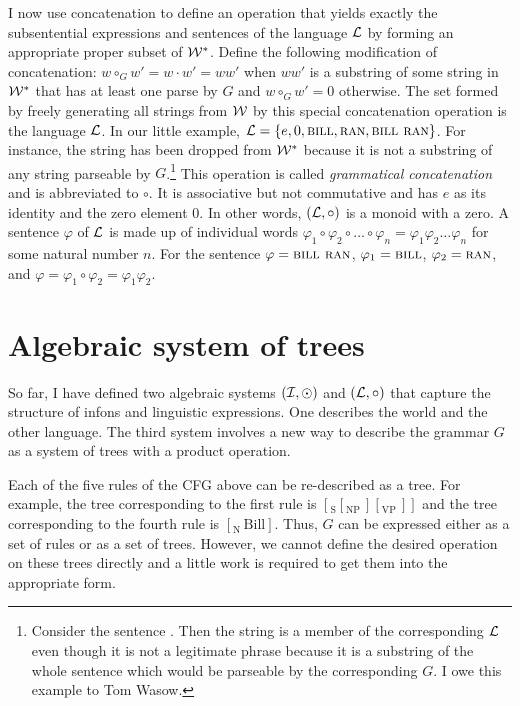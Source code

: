 I now use concatenation to define an operation that yields exactly the subsentential expressions and sentences of the language 
$\cal L$ by forming an appropriate proper subset of ${\cal W}^{\ast}$. Define the following modification of concatenation: $w \circ_G w' = w \cdot w' = ww'$ when $ww'$ is a substring of some string in ${\cal W}^{\ast}$ that has at least one parse by $G$ and $w \circ_G w' = 0$ otherwise. The set formed by freely generating all strings from ${\cal W}$ by this special concatenation operation is the language $\cal L$. In our little example, ${\cal L} = \{e, 0, \Expression{Bill}, \Expression{ran}, \Expression{Bill ran}\}$. For instance, the string  has been dropped from ${\cal W}^{\ast}$ because it is not a substring of any string parseable by $G$.\footnote{Consider the sentence . Then the string  is a member of the corresponding $\cal L$ even though it is not a legitimate phrase because it is a substring of the whole sentence which would be parseable by the corresponding $G$. I owe this example to Tom Wasow.} This operation is called \emph{grammatical concatenation} and is abbreviated to $\circ$. It is associative but not commutative and has $e$ as its identity and the zero element $0$. In other words, $({\cal L}, \circ)$ is a monoid with a zero. A sentence $\varphi$ of $\cal L$ is made up of individual words $\varphi_1 \circ \varphi_2 \circ \ldots \circ \varphi_n = \varphi_1 \varphi_2 \ldots \varphi_n$ for some natural number $n$. For the sentence $\varphi = \Expression{Bill ran}$, $\varphi_1 = \Expression{Bill}$, $\varphi_2 = \Expression{ran}$, and $\varphi = \varphi_1 \circ \varphi_2 = \varphi_1\varphi_2$. 



\section{Algebraic system of trees} \label{sec:algebraic system of trees}
So far, I have defined two algebraic systems $({\cal I}, \odot)$ and $({\cal L}, \circ)$ that capture the structure of infons and linguistic expressions. One describes the world and the other language. The third system involves a new way to describe the grammar $G$ as a system of trees with a product operation.

Each of the five rules of the CFG above can be re-described as a tree. For example, the tree corresponding to the first rule is $[_{\mathrm{S}}[_{\mathrm{NP}}\, ][_{\mathrm{VP}}\, ]]$ and the tree corresponding to the fourth rule is $[_{\mathrm{N}}\, \mathrm{Bill}]$. Thus, $G$ can be expressed either as a set of rules or as a set of trees. However, we cannot define the desired operation on these trees directly and a little work is required to get them into the appropriate form.

